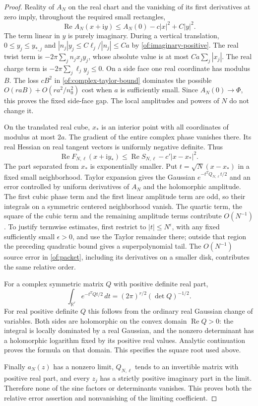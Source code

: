 \documentclass[11pt]{article}
\numberwithin{equation}{section}
\theoremstyle{definition}\newtheorem{definition}[theorem]{Definition}
\theoremstyle{remark}\newtheorem{remark}[theorem]{Remark}
\newcommand{\ii}{\mathrm i}
\newcommand{\Rea}{\operatorname{Re}}
\begin{document}
\begin{proof}
Reality of $A_N$ on the real chart and the vanishing of its first
derivatives at zero imply, throughout the required small rectangles,
\begin{equation}\label{of:complex-taylor-bound}
 \Rea A_N(x+\ii y)\le A_N(0)-c|x|^2+C|y|^2.
\end{equation}
The term linear in $y$ is purely imaginary. During a vertical
translation, $0\le y_j\le y_{*,j}$ and
$|n_j|y_j\le C\ell_j/|n_j|\le Ca$ by
\eqref{of:imaginary-positive}. The real twist term is
$-2\pi\sum_j n_jx_jy_j$, whose absolute value is at most
$Ca\sum_j|x_j|$. The real charge term is
$-2\pi\sum_j\ell_jy_j\le0$.
On a side face one real coordinate has modulus $B$. The loss
$cB^2$ in \eqref{of:complex-taylor-bound} dominates the possible
$O(raB)+O(ra^2/n_0^2)$ cost when $a$ is sufficiently small. Since
$A_N(0)\to\Phi$, this proves the fixed side-face gap. The local
amplitudes and powers of $N$ do not change it.

On the translated real cube, $x_*$ is an interior point with all
coordinates of modulus at most $2a$. The gradient of the entire complex
phase vanishes there. Its real Hessian on real tangent vectors is
uniformly negative definite. Thus
\[
 \Rea F_{N,\ell}(x+\ii y_*)
             \le\Rea S_{N,\ell}-c'|x-x_*|^2.
\]
The part separated from $x_*$ is exponentially smaller. Put
$t=\sqrt N(x-x_*)$ in a fixed small neighborhood. Taylor expansion
gives the Gaussian $e^{-t^TQ_{N,\ell}t/2}$ and an error controlled
by uniform derivatives of $A_N$ and the holomorphic amplitude. The
first cubic phase term and the first linear amplitude term are odd,
so their integrals on a symmetric centered neighborhood vanish.
The quartic term, the square of the cubic term and the remaining
amplitude terms contribute $O(N^{-1})$. To justify termwise estimates,
first restrict to $|t|\le N^\epsilon$, with any fixed sufficiently
small $\epsilon>0$, and use the Taylor remainder there; outside that
region the preceding quadratic bound gives a superpolynomial tail.
The $O(N^{-1})$ source error in \eqref{of:packet}, including its
derivatives on a smaller disk, contributes the same relative order.

For a complex symmetric matrix $Q$ with positive definite real part,
\[
 \int_{\mathbb R^r}e^{-t^TQt/2}\,dt
                            =(2\pi)^{r/2}(\det Q)^{-1/2}.
\]
For real positive definite $Q$ this follows from the ordinary real
Gaussian change of variables. Both sides are holomorphic on the convex
domain $\Rea Q>0$: the integral is locally dominated by a real
Gaussian, and the nonzero determinant has a holomorphic logarithm
fixed by its positive real values. Analytic continuation proves the
formula on that domain. This specifies the square root used above.

Finally $a_N(z)$ has a nonzero limit, $Q_{N,\ell}$ tends to an
invertible matrix with positive real part, and every $z_j$ has a
strictly positive imaginary part in the limit. Therefore none of
the sine factors or determinants vanishes. This proves both the
relative error assertion and nonvanishing of the limiting coefficient.
\end{proof}
\end{document}
